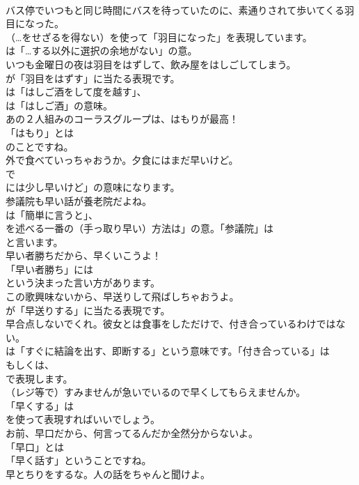 \documentclass[8pt]{extreport}
\begin{document}
\begin{CJK}{UTF8}{min}
\\	バス停でいつもと同じ時間にバスを待っていたのに、素通りされて歩いてくる羽目になった。 
\\	（…をせざるを得ない）を使って「羽目になった」を表現しています。
\\	は「…する以外に選択の余地がない」の意。	
\\	いつも金曜日の夜は羽目をはずして、飲み屋をはしごしてしまう。 
\\	が「羽目をはずす」に当たる表現です。
\\	は「はしご酒をして度を越す」、
\\	は「はしご酒」の意味。	
\\	あの２人組みのコーラスグループは、はもりが最高！ 
\\	「はもり」とは
\\	のことですね。	
\\	外で食べていっちゃおうか。夕食にはまだ早いけど。 
\\	で
\\	には少し早いけど」の意味になります。	
\\	参議院も早い話が養老院だよね。 
\\	は「簡単に言うと」、
\\	を述べる一番の（手っ取り早い）方法は」の意。「参議院」は
\\	と言います。	
\\	早い者勝ちだから、早くいこうよ！ 
\\	「早い者勝ち」には
\\	という決まった言い方があります。	
\\	この歌興味ないから、早送りして飛ばしちゃおうよ。 
\\	が「早送りする」に当たる表現です。	
\\	早合点しないでくれ。彼女とは食事をしただけで、付き合っているわけではない。 
\\	は「すぐに結論を出す、即断する」という意味です。「付き合っている」は
\\	もしくは、
\\	で表現します。	
\\	（レジ等で）すみませんが急いでいるので早くしてもらえませんか。 
\\	「早くする」は
\\	を使って表現すればいいでしょう。	
\\	お前、早口だから、何言ってるんだか全然分からないよ。 
\\	「早口」とは
\\	「早く話す」ということですね。	
\\	早とちりをするな。人の話をちゃんと聞けよ。 

\end{CJK}
\end{document}
